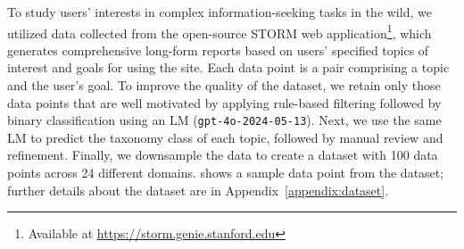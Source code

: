 To study users’ interests in complex information-seeking tasks in the wild,
we utilized data collected from the open-source STORM web application\footnote{Available at \url{https://storm.genie.stanford.edu}}, which generates comprehensive long-form reports based on users’ specified topics of interest and goals for using the site. %
Each data point is a pair comprising a topic and the user's goal. 
To improve the quality of the dataset, we retain only those data points that are well motivated by applying rule-based filtering followed by binary classification using an LM (\texttt{gpt-4o-2024-05-13}). Next, we use the same LM to predict the taxonomy class of each topic, followed by manual review and refinement. Finally, we downsample the data to create a dataset with 100 data points across 24 different domains.  shows a sample data point from the dataset; further details about the dataset are in Appendix~\ref{appendix:dataset}. 


